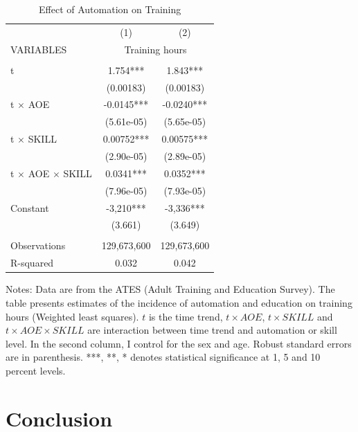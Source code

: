 \documentclass[12pt]{article}
\begin{document}
\begin{table}[h!]
\begin{center}
\scriptsize
\begin{tabular}{lcc} \hline \hline
 & (1) & (2) \\
VARIABLES & \multicolumn{2}{c}{Training hours} \\ \hline
 &  &  \\
t  & 1.754*** & 1.843*** \\
 & (0.00183) & (0.00183) \\
t $\times$ AOE & -0.0145*** & -0.0240*** \\
 & (5.61e-05) & (5.65e-05) \\
t $\times$ SKILL & 0.00752*** & 0.00575*** \\
 & (2.90e-05) & (2.89e-05) \\
t $\times$ AOE $\times$ SKILL & 0.0341*** & 0.0352*** \\
 & (7.96e-05) & (7.93e-05) \\
Constant & -3,210*** & -3,336*** \\
 & (3.661) & (3.649) \\
 &  &  \\
Observations & 129,673,600 & 129,673,600 \\
 R-squared & 0.032 & 0.042 \\ \hline
\end{tabular}
\end{center}
\caption{Effect of Automation on Training}
\label{estimation4}
{\scriptsize Notes: Data are from the ATES (Adult Training and Education Survey). The table presents estimates of the incidence of automation and education on training hours (Weighted least squares). $t$ is the time trend, $t\times AOE$, $t\times SKILL$ and $t\times AOE\times SKILL$ are interaction between time trend and automation or skill level. In the second column, I control for the sex and age. Robust standard errors are in parenthesis. ***, **, * denotes statistical significance at 1, 5 and 10 percent levels.}
\end{table}

\section{Conclusion}
\end{document}
